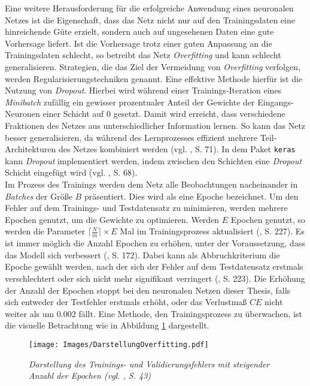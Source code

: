 \documentclass[a4paper,11pt]{article}
\begin{document}
Eine weitere Herausforderung für die erfolgreiche Anwendung eines neuronalen Netzes ist die Eigenschaft, dass das Netz nicht nur auf den Trainingsdaten eine hinreichende Güte erzielt, sondern auch auf ungesehenen Daten eine gute Vorhersage liefert. Ist die Vorhersage trotz einer guten Anpassung an die Trainingsdaten schlecht, so betreibt das Netz \textit{Overfitting} und kann schlecht generalisieren. Strategien, die das Ziel der Vermeidung von \textit{Overfitting} verfolgen, werden Regularisierungstechniken genannt. Eine effektive Methode hierfür ist die Nutzung von \textit{Dropout}. Hierbei wird während einer Trainings-Iteration eines \textit{Minibatch} zufällig ein gewisser prozentualer Anteil der Gewichte der Eingangs-Neuronen einer Schicht auf $0$ gesetzt. Damit wird erreicht, dass verschiedene Fraktionen des Netzes aus unterschiedlicher Information lernen. So kann das Netz besser generalisieren, da während des Lernprozesses effizient mehrere Teil-Architekturen des Netzes kombiniert werden (vgl. \cite{deepEssentials}, S. 71). In dem Paket \texttt{keras} kann \textit{Dropout} implementiert werden, indem zwischen den Schichten eine \textit{Dropout} Schicht eingefügt wird (vgl. \cite{keras}, S. 68).\\
Im Prozess des Trainings werden dem Netz alle Beobachtungen nacheinander in \textit{Batches} der Größe $B$ präsentiert. Dies wird als eine Epoche bezeichnet. Um den Fehler auf dem Trainings- und Testdatensatz zu minimieren, werden mehrere Epochen genutzt, um die Gewichte zu optimieren. Werden $E$ Epochen genutzt, so werden die Parameter $\lceil \frac{N}{m} \rceil \times E$ Mal im Trainingsprozess aktualisiert (\cite{deepNLP}, S. 227). Es ist immer möglich die Anzahl Epochen zu erhöhen, unter der Voraussetzung, dass das Modell sich verbessert (\cite{deepNLP}, S. 172). Dabei kann als Abbruchkriterium die Epoche gewählt werden, nach der sich der Fehler auf dem Testdatensatz erstmals verschlechtert oder sich nicht mehr signifikant verringert (\cite{deepEssentials}, S. 223). Die Erhöhung der Anzahl der Epochen stoppt bei den neuronalen Netzen dieser Thesis, falls sich entweder der  Testfehler erstmals erhöht, oder das Verlustmaß $CE$ nicht weiter als um $0.002$ fällt. Eine Methode, den Trainingsprozess zu überwachen, ist die visuelle Betrachtung wie in Abbildung \ref{abb:overfitting} dargestellt.

\begin{figure}[!ht]
\begin{center}
\texttt{[image: Images/DarstellungOverfitting.pdf]}
\caption{\textit{Darstellung des Trainings- und Validierungsfehlers mit steigender Anzahl der Epochen (vgl. \cite{keras}, S. 43)}}
\label{abb:overfitting}
\end{center}
\end{figure}
\end{document}
